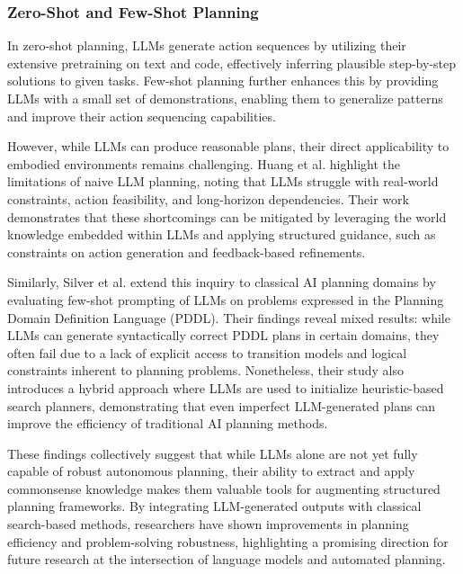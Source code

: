 \subsubsection{Zero-Shot and Few-Shot Planning}
In zero-shot planning, LLMs generate action sequences by utilizing their
extensive pretraining on text and code, effectively inferring plausible step-by-step
solutions to given tasks. Few-shot planning further enhances this by providing
LLMs with a small set of demonstrations, enabling them to generalize patterns and
improve their action sequencing capabilities.

However, while LLMs can produce reasonable plans, their direct applicability to embodied
environments remains challenging. Huang et al. \cite{huang2022languagemodelszeroshotplanners}
highlight the limitations of naive LLM planning, noting that LLMs struggle with
real-world constraints, action feasibility, and long-horizon dependencies. Their
work demonstrates that these shortcomings can be mitigated by leveraging the world
knowledge embedded within LLMs and applying structured guidance, such as
constraints on action generation and feedback-based refinements.

Similarly, Silver et al. \cite{silver2022pddl} extend this inquiry to classical
AI planning domains by evaluating few-shot prompting of LLMs on problems
expressed in the Planning Domain Definition Language (PDDL). Their findings reveal
mixed results: while LLMs can generate syntactically correct PDDL plans in
certain domains, they often fail due to a lack of explicit access to transition models
and logical constraints inherent to planning problems. Nonetheless, their study also
introduces a hybrid approach where LLMs are used to initialize heuristic-based search
planners, demonstrating that even imperfect LLM-generated plans can improve the
efficiency of traditional AI planning methods.

These findings collectively suggest that while LLMs alone are not yet fully
capable of robust autonomous planning, their ability to extract and apply commonsense
knowledge makes them valuable tools for augmenting structured planning frameworks.
By integrating LLM-generated outputs with classical search-based methods, researchers
have shown improvements in planning efficiency and problem-solving robustness,
highlighting a promising direction for future research at the intersection of
language models and automated planning.

